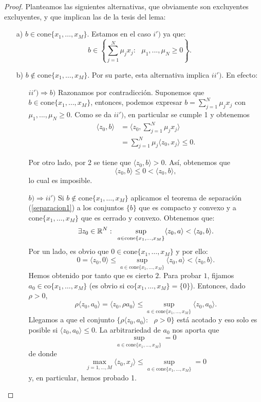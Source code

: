 \begin{proof}
Planteamos las siguientes alternativas, que obviamente son excluyentes excluyentes, y que implican las de la tesis del lema:
\begin{itemize}
	\item[a)] $b \in \mathrm{cone}\{x_1,\dots, x_M \} $. Estamos en el caso $ i') $  ya que:
	\[
	b \in \left\lbrace \sum_{j=1}^{N}{\mu_j x_j } : \text{ } \mu_1,...,\mu_N \geq 0 \right\rbrace .
	\]
	\item[b)] $ b \notin \mathrm{cone}\{x_1,\dots, x_M \} $. Por su parte, esta alternativa implica $ ii') $. En efecto: 
	
	\begin{itemize}
	\item[$ ii') \Longrightarrow b) $] Razonamos por contradicción. Suponemos que $ b \in \mathrm{cone}\{x_1,\dots, x_M \} $, entonces, podemos expresar $ b =  \sum_{j=1}^{N}{\mu_j x_j } $ con $ \mu_1,...,\mu_N \geq 0$. Como se da $ ii') $, en particular se cumple 1 y obtenemos
	\begin{equation*}
	\begin{split}
		\langle z_0, b \rangle & = \langle z_0, \sum_{j=1}^{N}{\mu_j x_j } \rangle \\
		&= \sum_{j=1}^{N}{\mu_j\langle z_0, x_j \rangle } \leq 0.
	\end{split}
	\end{equation*}
	
	Por otro lado, por 2 se tiene que  $ \langle z_0, b\rangle > 0$. Así, obtenemos que
	\[
	\langle z_0, b \rangle \leq 0 <  \langle z_0, b \rangle,
	\]
	lo cual es imposible.
	\item[$ b) \Longrightarrow ii') $] Si $ b \notin \mathrm{cone}\{x_1,\dots, x_M \} $ aplicamos el teorema de separación (\ref{separacion1}) a los conjuntos $ \{b\} $ que es compacto y convexo y a $ \mathrm{cone}\{x_1,\dots, x_M \} $ que es cerrado y convexo. Obtenemos que:
	\[
	\exists z_0 \in \mathbb{R}^N: \text{ } \sup_{a \in \mathrm{cone}\{x_1,\dots, x_M \}} \langle z_0, a \rangle < \langle z_0, b \rangle.
	\]
	Por un lado, es obvio que $ 0 \in \mathrm{cone}\{x_1,\dots, x_M \} $ y por ello:
	\[
	0 = \langle z_0, 0\rangle \leq \sup_{a \in \mathrm{cone}\{x_1,\dots, x_M \}} \langle z_0, a \rangle < \langle z_0, b \rangle.
	\]
	Hemos obtenido por tanto que es cierto $ 2 $. Para probar $ 1 $, fijamos $ a_0 \in \mathrm{co}\{x_1,\dots, x_M \}$ (es obvio si $ \mathrm{co}\{x_1,\dots, x_M \} = \{0\}$). Entonces, dado $ \rho > 0 $,
	\[
	\rho\langle z_0, a_0 \rangle = \langle z_0, \rho a_0 \rangle \leq \sup_{a \in \mathrm{cone}\{x_1,\dots, x_M \}} \langle z_0, a_0 \rangle.
	\]
	Llegamos a que el conjunto $ \lbrace\rho\langle z_0, a_0 \rangle: \text{ } \rho > 0 \rbrace  $ está acotado y eso solo es posible si $ \langle z_0, a_0 \rangle \leq 0 $. La arbitrariedad de $ a_0 $ nos aporta que \[ \sup_{a \in \mathrm{cone}\{x_1,\dots, x_M \}} = 0 \] de donde \[
	\max_{ j=1,\dots,M} \langle z_0, x_j \rangle \leq \sup_{a \in \mathrm{cone}\{x_1,\dots, x_M \}} = 0  
	\]
	y, en particular, hemos probado 1.
	\end{itemize}
\end{itemize}
\end{proof}